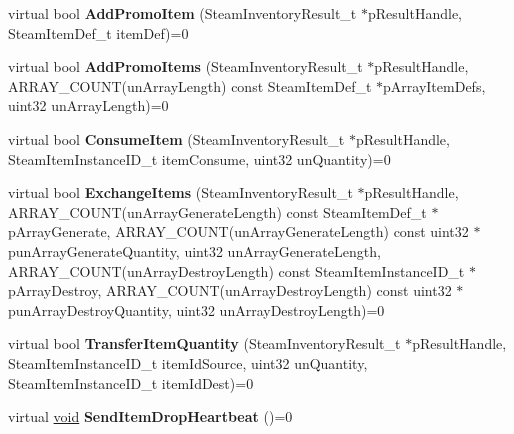 \begin{DoxyCompactItemize}
\item 
\hypertarget{classISteamInventory_ae5625ecc3c2e08f563231a4290f35dd8}{}virtual bool {\bfseries Add\+Promo\+Item} (Steam\+Inventory\+Result\+\_\+t $\ast$p\+Result\+Handle, Steam\+Item\+Def\+\_\+t item\+Def)=0\label{classISteamInventory_ae5625ecc3c2e08f563231a4290f35dd8}

\item 
\hypertarget{classISteamInventory_a608aa5b19aa356579a1f3e6540e6a317}{}virtual bool {\bfseries Add\+Promo\+Items} (Steam\+Inventory\+Result\+\_\+t $\ast$p\+Result\+Handle, A\+R\+R\+A\+Y\+\_\+\+C\+O\+U\+N\+T(un\+Array\+Length) const Steam\+Item\+Def\+\_\+t $\ast$p\+Array\+Item\+Defs, uint32 un\+Array\+Length)=0\label{classISteamInventory_a608aa5b19aa356579a1f3e6540e6a317}

\item 
\hypertarget{classISteamInventory_a00be78e3a87ded4d32568e67e20d2c52}{}virtual bool {\bfseries Consume\+Item} (Steam\+Inventory\+Result\+\_\+t $\ast$p\+Result\+Handle, Steam\+Item\+Instance\+I\+D\+\_\+t item\+Consume, uint32 un\+Quantity)=0\label{classISteamInventory_a00be78e3a87ded4d32568e67e20d2c52}

\item 
\hypertarget{classISteamInventory_a0b03243926fd83d436275b640ae1965e}{}virtual bool {\bfseries Exchange\+Items} (Steam\+Inventory\+Result\+\_\+t $\ast$p\+Result\+Handle, A\+R\+R\+A\+Y\+\_\+\+C\+O\+U\+N\+T(un\+Array\+Generate\+Length) const Steam\+Item\+Def\+\_\+t $\ast$p\+Array\+Generate, A\+R\+R\+A\+Y\+\_\+\+C\+O\+U\+N\+T(un\+Array\+Generate\+Length) const uint32 $\ast$pun\+Array\+Generate\+Quantity, uint32 un\+Array\+Generate\+Length, A\+R\+R\+A\+Y\+\_\+\+C\+O\+U\+N\+T(un\+Array\+Destroy\+Length) const Steam\+Item\+Instance\+I\+D\+\_\+t $\ast$p\+Array\+Destroy, A\+R\+R\+A\+Y\+\_\+\+C\+O\+U\+N\+T(un\+Array\+Destroy\+Length) const uint32 $\ast$pun\+Array\+Destroy\+Quantity, uint32 un\+Array\+Destroy\+Length)=0\label{classISteamInventory_a0b03243926fd83d436275b640ae1965e}

\item 
\hypertarget{classISteamInventory_ad0a8c94ef54e9199d752ffd91c0d671b}{}virtual bool {\bfseries Transfer\+Item\+Quantity} (Steam\+Inventory\+Result\+\_\+t $\ast$p\+Result\+Handle, Steam\+Item\+Instance\+I\+D\+\_\+t item\+Id\+Source, uint32 un\+Quantity, Steam\+Item\+Instance\+I\+D\+\_\+t item\+Id\+Dest)=0\label{classISteamInventory_ad0a8c94ef54e9199d752ffd91c0d671b}

\item 
\hypertarget{classISteamInventory_aa10315154a5f1e44468dadd2c30b392e}{}virtual \hyperlink{SDL__audio_8h_a52835ae37c4bb905b903cbaf5d04b05f}{void} {\bfseries Send\+Item\+Drop\+Heartbeat} ()=0\label{classISteamInventory_aa10315154a5f1e44468dadd2c30b392e}


\end{DoxyCompactItemize}
